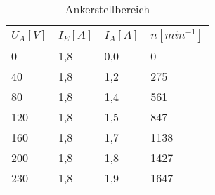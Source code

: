 \begin{table}[htbp]
      \centering
      \begin{tabularx}{\columnwidth}{XXXX}
            \toprule
            $U_A[V]$ & $I_E[A]$ & $I_A[A]$ & $n[min^{-1}]$ \\
            \midrule
            0        & 1,8      & 0,0      & 0             \\
            40       & 1,8      & 1,2      & 275           \\
            80       & 1,8      & 1,4      & 561           \\
            120      & 1,8      & 1,5      & 847           \\
            160      & 1,8      & 1,7      & 1138          \\
            200      & 1,8      & 1,8      & 1427          \\
            230      & 1,8      & 1,9      & 1647          \\
            \bottomrule
      \end{tabularx}
      \caption{Ankerstellbereich}
\end{table}
